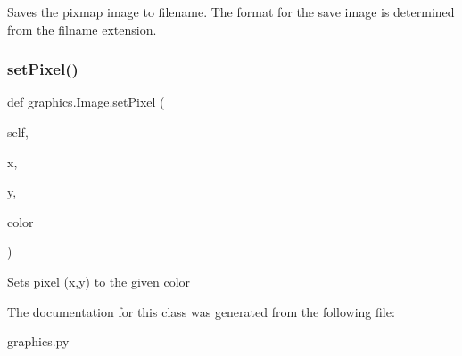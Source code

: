 \begin{DoxyVerb}Saves the pixmap image to filename.
The format for the save image is determined from the filname extension.\end{DoxyVerb}
 \mbox{\label{classgraphics_1_1_image_a73fb3ce4de03fe9f57c076d739712378}} 
\subsubsection{\texorpdfstring{set\+Pixel()}{setPixel()}}
{\footnotesize\ttfamily def graphics.\+Image.\+set\+Pixel (\begin{DoxyParamCaption}\item[{}]{self,  }\item[{}]{x,  }\item[{}]{y,  }\item[{}]{color }\end{DoxyParamCaption})}

\begin{DoxyVerb}Sets pixel (x,y) to the given color\end{DoxyVerb}
 

The documentation for this class was generated from the following file\+:\begin{DoxyCompactItemize}
\item 
graphics.\+py\end{DoxyCompactItemize}
